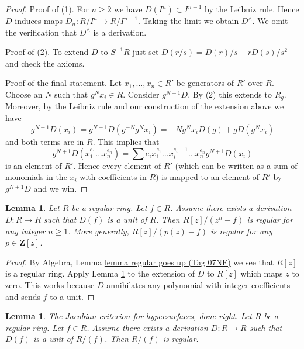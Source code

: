 \documentclass{amsart}
\newenvironment{slogan}{\comment}{\endcomment}
\theoremstyle{plain}
\newtheorem{lemma}[subsection]{Lemma}
\theoremstyle{definition}
\theoremstyle{remark}
\numberwithin{equation}{subsection}
\begin{document}
\begin{proof}
Proof of (1). For $n \geq 2$ we have $D(I^n) \subset I^{n - 1}$
by the Leibniz rule. Hence $D$ induces maps $D_n : R/I^n \to R/I^{n - 1}$.
Taking the limit we obtain $D^\wedge$. We omit the verification that
$D^\wedge$ is a derivation.

\medskip\noindent
Proof of (2). To extend $D$ to $S^{-1}R$ just set
$D(r/s) = D(r)/s - rD(s)/s^2$ and check the axioms.

\medskip\noindent
Proof of the final statement. Let $x_1, \ldots, x_n \in R'$ be generators
of $R'$ over $R$. Choose an $N$ such that $g^Nx_i \in R$.
Consider $g^{N + 1}D$. By (2) this extends to $R_g$. Moreover, by
the Leibniz rule and our construction of the extension above we have
$$
g^{N + 1}D(x_i) = g^{N + 1}D(g^{-N} g^Nx_i) = -Ng^Nx_iD(g) +
gD(g^Nx_i)
$$
and both terms are in $R$. This implies that
$$
g^{N + 1}D(x_1^{e_1} \ldots x_n^{e_n}) =
\sum e_i x_1^{e_1} \ldots x_i^{e_i - 1} \ldots x_n^{e_n} g^{N + 1}D(x_i)
$$
is an element of $R'$. Hence every element of $R'$ (which can be written
as a sum of monomials in the $x_i$ with coefficients in $R$) is mapped to an
element of $R'$ by $g^{N + 1}D$ and we win.
\end{proof}


\begin{lemma}
\label{lemma-degree-p-extension-regular}
Let $R$ be a regular ring. Let $f \in R$.
Assume there exists a derivation $D : R \to R$ such that $D(f)$ is a unit
of $R$. Then $R[z]/(z^n - f)$ is regular for any integer $n \geq 1$.
More generally, $R[z]/(p(z) - f)$ is regular for any $p \in \mathbf{Z}[z]$.
\end{lemma}

\begin{proof}
By Algebra, Lemma \href{https://stacks.math.columbia.edu/tag/07NF}{lemma regular goes up (Tag 07NF)} we see that
$R[z]$ is a regular ring. Apply Lemma \ref{lemma-quotient-regular}
to the extension of $D$ to $R[z]$ which maps $z$ to zero.
This works because $D$ annihilates any polynomial with
integer coefficients and sends $f$ to a unit.
\end{proof}


\begin{lemma}
\label{lemma-quotient-regular}
\begin{slogan}
The Jacobian criterion for hypersurfaces, done right.
\end{slogan}
Let $R$ be a regular ring. Let $f \in R$. Assume there exists a
derivation $D : R \to R$ such that $D(f)$ is a unit of $R/(f)$.
Then $R/(f)$ is regular.
\end{lemma}
\end{document}
